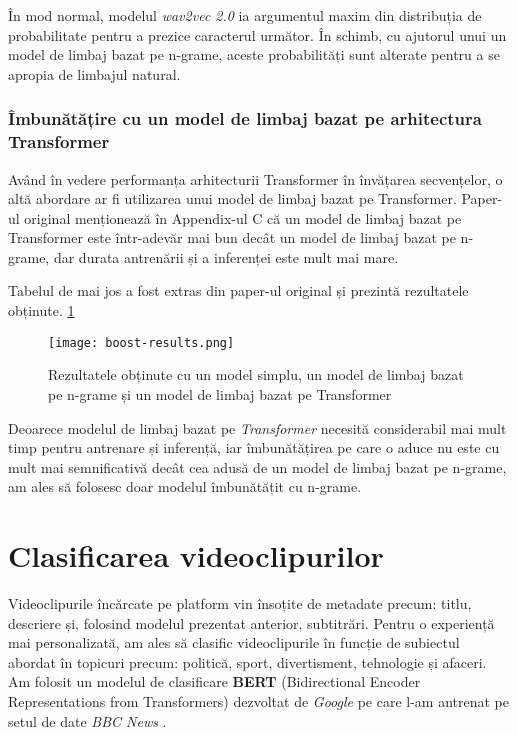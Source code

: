 \par
În mod normal, modelul \textit{wav2vec 2.0} ia argumentul maxim din distribuția de probabilitate
pentru a prezice caracterul următor. În schimb, cu ajutorul unui un model de limbaj bazat pe n-grame,
aceste probabilități sunt alterate pentru a se apropia de limbajul natural. 

\subsubsection{Îmbunătățire cu un model de limbaj bazat pe arhitectura Transformer}
\vspace{1em}
Având în vedere performanța arhitecturii Transformer în învățarea secvențelor, o altă abordare
ar fi utilizarea unui model de limbaj bazat pe Transformer. Paper-ul original \cite{wav2vec2}
menționează în Appendix-ul C că un model de limbaj bazat pe Transformer este într-adevăr mai
bun decât un model de limbaj bazat pe n-grame, dar durata antrenării și a inferenței este
mult mai mare. 
\par 
Tabelul de mai jos a fost extras din paper-ul original și prezintă rezultatele obținute. \ref{fig:boost-results}

\begin{figure}[h!]
    \centering
    \texttt{[image: boost-results.png]}
    \caption{Rezultatele obținute cu un model simplu, un model de limbaj bazat pe n-grame și un model de limbaj bazat pe Transformer}
    \label{fig:boost-results}
\end{figure}

\par
Deoarece modelul de limbaj bazat pe \textit{Transformer} necesită considerabil mai mult timp pentru antrenare și inferență,
iar îmbunătățirea pe care o aduce nu este cu mult mai semnificativă decât cea adusă de un model de limbaj
bazat pe n-grame, am ales să folosesc doar modelul îmbunătățit cu n-grame.

\section{Clasificarea videoclipurilor}
\label{sec:clasificare-videoclipuri}
Videoclipurile încărcate pe platform vin însoțite de metadate precum: titlu, descriere și, folosind
modelul prezentat anterior, subtitrări. Pentru o experiență mai personalizată, am ales să clasific
videoclipurile în funcție de subiectul abordat în topicuri precum: politică, sport, divertisment,
tehnologie și afaceri. Am folosit un modelul de clasificare \textbf{BERT} (Bidirectional Encoder Representations
from Transformers) dezvoltat de \textit{Google} \cite{devlin2019bert} pe care l-am antrenat pe setul de date
\textit{BBC News} \cite{greene06icml}.

